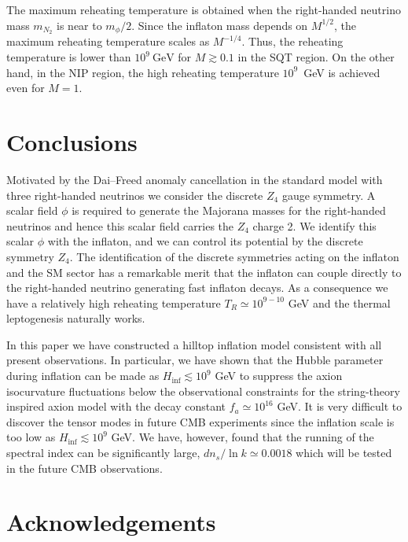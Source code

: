 \documentclass[11pt,a4paper]{article}
\begin{document}
The maximum reheating temperature is obtained when the right-handed neutrino mass $m_{N_2}$ is near to $m_\phi/2$.
Since the inflaton mass depends on $M^{1/2}$, the maximum reheating temperature scales as $M^{-1/4}$.
Thus, the reheating temperature is lower than $10^9~\mathrm{GeV}$ for $M\gtrsim 0.1$ in the SQT region.
On the other hand, in the NIP region, the high reheating temperature $10^9$~GeV is achieved even for $M=1$.


\section{Conclusions}
\label{sec:Conclusions}

Motivated by the Dai--Freed anomaly cancellation in the standard model with three right-handed neutrinos we consider the discrete $Z_4$ gauge symmetry. 
A scalar field $\phi$ is required to generate the Majorana masses for the right-handed neutrinos and hence this scalar field carries the $Z_4$ charge 2. 
We identify this scalar $\phi$ with the inflaton, and we can control its potential by the discrete symmetry $Z_4$. 
The identification of the discrete symmetries acting on the inflaton and the SM sector has a remarkable merit that the inflaton can couple directly to the right-handed neutrino generating fast inflaton decays. 
As a consequence we have a relatively high reheating temperature $T_R \simeq 10^{9-10}$ GeV and the thermal leptogenesis naturally works.

In this paper we have constructed a hilltop inflation model consistent with all present observations. 
In particular, we have shown that the Hubble parameter during inflation can be made as $H_\mathrm{inf} \lesssim 10^{9}$ GeV to suppress the axion isocurvature fluctuations below the observational constraints for the string-theory inspired axion model with the decay constant $f_a \simeq 10^{16}$ GeV. 
It is very difficult to discover the tensor modes in future CMB experiments since the inflation scale is too low as $H_\mathrm{inf} \lesssim 10^{9}$ GeV.
We have, however, found that the running of the spectral index can be significantly large, $dn_s/\ln k  \simeq  0.0018$ which will be tested in the future CMB observations. 




 \section*{Acknowledgements}
\end{document}
